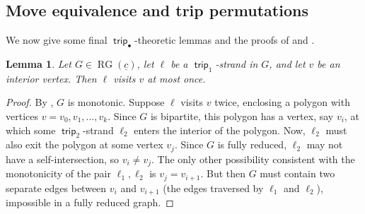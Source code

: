 \documentclass{amsart}
\newtheorem{lemma}[theorem]{Lemma}
\theoremstyle{definition}
\theoremstyle{remark}
\numberwithin{equation}{section}
\DeclareMathOperator{\trip}{\mathsf{trip}}
\DeclareMathOperator{\rg}{RG}
\begin{document}
\subsection{Move equivalence and trip permutations}
\label{sec:move-equiv-and-trips}

We now give some final $\trip_\bullet$-theoretic lemmas and the proofs of  and .

\begin{lemma}
\label{lem:trip1-does-not-revisit-vertex}
Let $G \in \rg(\underline{c})$, let $\ell$ be a $\trip_1$-strand in $G$, and let $v$ be an interior vertex. Then $\ell$ visits $v$ at most once.
\end{lemma}
\begin{proof}
By , $G$ is monotonic. Suppose $\ell$ visits $v$ twice, enclosing a polygon with vertices $v=v_0,v_1,\ldots,v_k$. Since $G$ is bipartite, this polygon has a vertex, say $v_i$, at which some $\trip_2$-strand $\ell_2$ enters the interior of the polygon. Now, $\ell_2$ must also exit the polygon at some vertex $v_j$. Since $G$ is fully reduced, $\ell_2$ may not have a self-intersection, so $v_i \neq v_j$. The only other possibility consistent with the monotonicity of the pair $\ell_1,\ell_2$ is $v_j=v_{i+1}$. But then $G$ must contain two separate edges between $v_i$ and $v_{i+1}$ (the edges traversed by $\ell_1$ and $\ell_2$), impossible in a fully reduced graph.
\end{proof}
\end{document}
